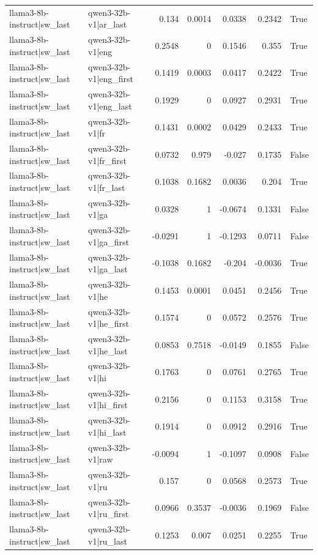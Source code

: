\begin{table}
\begin{tabular}{l l r r r r l}
llama3-8b-instruct|sw_last & qwen3-32b-v1|ar_last & 0.134 & 0.0014 & 0.0338 & 0.2342 & True \\
llama3-8b-instruct|sw_last & qwen3-32b-v1|eng & 0.2548 & 0 & 0.1546 & 0.355 & True \\
llama3-8b-instruct|sw_last & qwen3-32b-v1|eng_first & 0.1419 & 0.0003 & 0.0417 & 0.2422 & True \\
llama3-8b-instruct|sw_last & qwen3-32b-v1|eng_last & 0.1929 & 0 & 0.0927 & 0.2931 & True \\
llama3-8b-instruct|sw_last & qwen3-32b-v1|fr & 0.1431 & 0.0002 & 0.0429 & 0.2433 & True \\
llama3-8b-instruct|sw_last & qwen3-32b-v1|fr_first & 0.0732 & 0.979 & -0.027 & 0.1735 & False \\
llama3-8b-instruct|sw_last & qwen3-32b-v1|fr_last & 0.1038 & 0.1682 & 0.0036 & 0.204 & True \\
llama3-8b-instruct|sw_last & qwen3-32b-v1|ga & 0.0328 & 1 & -0.0674 & 0.1331 & False \\
llama3-8b-instruct|sw_last & qwen3-32b-v1|ga_first & -0.0291 & 1 & -0.1293 & 0.0711 & False \\
llama3-8b-instruct|sw_last & qwen3-32b-v1|ga_last & -0.1038 & 0.1682 & -0.204 & -0.0036 & True \\
llama3-8b-instruct|sw_last & qwen3-32b-v1|he & 0.1453 & 0.0001 & 0.0451 & 0.2456 & True \\
llama3-8b-instruct|sw_last & qwen3-32b-v1|he_first & 0.1574 & 0 & 0.0572 & 0.2576 & True \\
llama3-8b-instruct|sw_last & qwen3-32b-v1|he_last & 0.0853 & 0.7518 & -0.0149 & 0.1855 & False \\
llama3-8b-instruct|sw_last & qwen3-32b-v1|hi & 0.1763 & 0 & 0.0761 & 0.2765 & True \\
llama3-8b-instruct|sw_last & qwen3-32b-v1|hi_first & 0.2156 & 0 & 0.1153 & 0.3158 & True \\
llama3-8b-instruct|sw_last & qwen3-32b-v1|hi_last & 0.1914 & 0 & 0.0912 & 0.2916 & True \\
llama3-8b-instruct|sw_last & qwen3-32b-v1|raw & -0.0094 & 1 & -0.1097 & 0.0908 & False \\
llama3-8b-instruct|sw_last & qwen3-32b-v1|ru & 0.157 & 0 & 0.0568 & 0.2573 & True \\
llama3-8b-instruct|sw_last & qwen3-32b-v1|ru_first & 0.0966 & 0.3537 & -0.0036 & 0.1969 & False \\
llama3-8b-instruct|sw_last & qwen3-32b-v1|ru_last & 0.1253 & 0.007 & 0.0251 & 0.2255 & True \\

\end{tabular}
\end{table}
